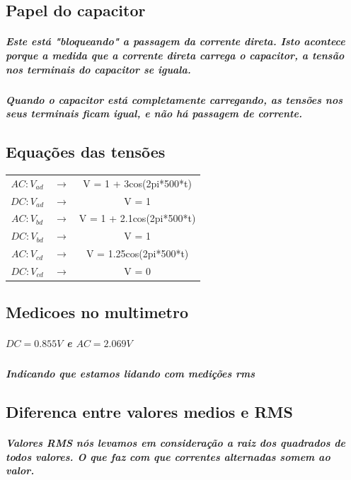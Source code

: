 \documentclass[12pt,twoside, a4paper, twocolumn]{article}
\begin{document}
\subsection{Papel do capacitor}

\subparagraph*{Este está "bloqueando" a passagem da corrente direta. Isto acontece porque a medida que a corrente direta carrega o capacitor, a tensão nos terminais do capacitor se iguala.}

\subparagraph*{Quando o capacitor está completamente carregando, as tensões nos seus terminais ficam igual, e não há passagem de corrente.}

\subsection{Equações das tensões}

\begin{center}
    \begin{tabular}{ |ccc| }
        \hline
        $AC: V_{ad}$ & $\rightarrow$ & V = 1 + 3cos(2pi*500*t)   \\
        $DC: V_{ad}$ & $\rightarrow$ & V = 1                     \\
        $AC: V_{bd}$ & $\rightarrow$ & V = 1 + 2.1cos(2pi*500*t) \\
        $DC: V_{bd}$ & $\rightarrow$ & V = 1                     \\
        $AC: V_{cd}$ & $\rightarrow$ & V = 1.25cos(2pi*500*t)    \\
        $DC: V_{cd}$ & $\rightarrow$ & V = 0                     \\
        \hline
    \end{tabular}
\end{center}




\subsection{Medicoes no multimetro}

\subparagraph*{$DC = 0.855V$ e $AC = 2.069V$}

\subparagraph*{Indicando que estamos lidando com medições rms}

\subsection{Diferenca entre valores medios e RMS}

\subparagraph*{Valores RMS nós levamos em consideração a raiz dos quadrados de todos valores. O que faz com que correntes alternadas somem ao valor. }
\end{document}
